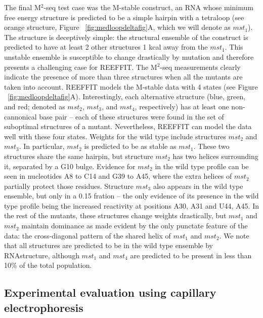 \documentclass[12pt]{article}
\begin{document}
The final M$^2$-seq test case was the M-stable construct, an RNA whose minimum free energy structure is predicted to be a simple hairpin with a tetraloop (see orange structure, Figure  ~\ref{fig:medloopdeltafig}A, which we will denote as $mst_1$). 
The structure is deceptively simple: the structural ensemble of the construct is predicted to have at least 2 other structures 1 kcal away from the $mst_1$. 
This unstable ensemble is susceptible to change drastically by mutation and therefore presents a challenging case for REEFFIT. 
The M$^2$-seq measurements clearly indicate the presence of more than three structures when all the mutants are taken into account. 
REEFFIT models the M-stable data with 4 states (see Figure ~\ref{fig:medloopdeltafig}A). 
Interestingly, each alternative structure (blue, green, and red; denoted as $mst_2$, $mst_3$, and $mst_4$, respectively) has at least one non-cannonical base pair -- each of these structures were found in the set of suboptimal structures of a mutant. 
Nevertheless, REEFFIT can model the data well with these four states. Weights for the wild type include structures $mst_2$ and $mst_3$. 
In particular, $mst_2$ is predicted to be as stable as $mst_1$. 
These two structures share the same hairpin, but structure $mst_2$ has two helices surrounding it, separated by a G10 bulge. 
Evidence for $mst_2$ in the wild type profile can be seen in nucleotides A8 to C14 and G39 to A45, where the extra helices of $mst_2$ partially protect those residues. 
Structure $mst_3$ also appears in the wild type ensemble, but only in a 0.15 fration -- the only evidence of its presence in the wild type profile being the increased reactivity at positions A30, A31 and U44, A45. 
In the rest of the mutants, these structures change weights drastically, but $mst_1$ and $mst_2$ maintain dominance as made evident by the only punctate feature of the data: the cross-diagonal pattern of the shared helix of $mst_1$ and $mst_2$.
We note that all structures are predicted to be in the wild type ensemble by RNAstructure, although $mst_1$ and $mst_4$ are predicted to be present in less than 10\% of the total population.


\subsection{Experimental evaluation using capillary electrophoresis}
\end{document}

